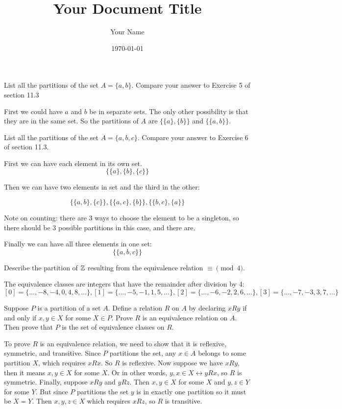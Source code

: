\documentclass{article}
\title{Your Document Title}
\author{Your Name}
\date{\today} %
\begin{document}
\maketitle

\begin{problem}
List all the partitions of the set $A = \{a, b\}$. Compare your answer to Exercise 5 of section 11.3
\end{problem}

First we could have $a$ and $b$ be in separate sets. The only other possibility is that they are in the same set. So the partitions of $A$ are $\{\{a\}, \{b\}\}$ and $\{\{a, b\}\}$.

\begin{problem}
List all the partitions of the set $A = \{a, b, c\}$. Compare your answer to Exercise 6 of section 11.3.
\end{problem}

First we can have each element in its own set.
$$\{\{a\}, \{b\}, \{c\}\}$$

Then we can have two elements in set and the third in the other:

$$\{\{a, b\}, \{c\}\}, \{\{a, c\}, \{b\}\}, \{\{b, c\}, \{a\}\}$$

Note on counting: there are 3 ways to choose the element to be a singleton, so there should be 3 possible partitions in this case, and there are.

Finally we can have all three elements in one set:
$$\{\{a, b, c\}\}$$

\begin{problem}
Describe the partition of $\mathbb{Z}$ resulting from the equivalence relation $\equiv \pmod{4}$.
\end{problem}

The equivalence classes are integers that have the remainder after division by 4:
$$[0] = \{\ldots, -8, -4, 0, 4, 8, \ldots\}, [1] = \{\ldots, -5, -1, 1, 5, \ldots\}, [2] = \{\ldots, -6, -2, 2, 6, \ldots\}, [3] = \{\ldots, -7, -3, 3, 7, \ldots\}$$

\begin{problem}
Suppose $P$ is a partition of a set $A$. Define a relation $R$ on $A$ by declaring $xRy$ if and only if $x, y \in X$ for some $X \in P$. Prove $R$ is an equivalence relation on $A$. Then prove that $P$ is the set of equivalence classes on $R$.
\end{problem}

To prove $R$ is an equivalence relation, we need to show that it is reflexive, symmetric, and transitive. Since $P$ partitions the set, any $x \in A$ belongs to some partition $X$, which requires $xRx$. So $R$ is reflexive. Now suppose we have $xRy$, then it means $x, y \in X$ for some $X$. Or in other words, $y, x \in X \leftrightarrow yRx$, so $R$ is symmetric. Finally, suppose $xRy$ and $yRz$. Then $x, y \in X$ for some $X$ and $y, z \in Y$ for some $Y$. But since $P$ partitions the set $y$ is in exactly one partition so it must be $X = Y$. Then $x, y, z \in X$ which requires $xRz$, so $R$ is transitive.
\end{document}
